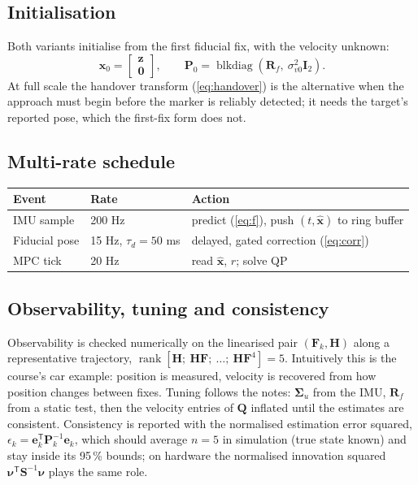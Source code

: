 \documentclass[11pt,a4paper]{article}
\newcommand{\vect}[1]{\bm{#1}}
\newcommand{\mat}[1]{\bm{#1}}
\newcommand{\T}{^{\mathsf{T}}}
\DeclareMathOperator{\blkdiag}{blkdiag}
\newcommand{\hx}{\hat{\vect{x}}}
\begin{document}
\subsection{Initialisation}
Both variants initialise from the first fiducial fix, with the velocity unknown:
\begin{equation}
\hx_0 = \begin{bmatrix}\vect z\\ \vect 0\end{bmatrix},\qquad
\mat P_0 = \blkdiag(\mat R_f,\ \sigma_{v0}^2\mat I_2).
\end{equation}
At full scale the handover transform (\ref{eq:handover}) is the alternative when the approach must begin before the marker is reliably detected; it needs the target's reported pose, which the first-fix form does not.

\subsection{Multi-rate schedule}
\begin{center}
\begin{tabular}{lll}
\toprule
Event & Rate & Action \\
\midrule
IMU sample & 200 Hz & predict (\ref{eq:f}), push $(t,\hx)$ to ring buffer \\
Fiducial pose & 15 Hz, $\tau_d=50$ ms & delayed, gated correction (\ref{eq:corr}) \\
MPC tick & 20 Hz & read $\hx$, $r$; solve QP \\
\bottomrule
\end{tabular}
\end{center}

\subsection{Observability, tuning and consistency}
Observability is checked numerically on the linearised pair $(\mat F_k,\mat H)$ along a representative trajectory, $\operatorname{rank}[\mat H;\ \mat H\mat F;\ \ldots;\ \mat H\mat F^4]=5$. Intuitively this is the course's car example: position is measured, velocity is recovered from how position changes between fixes. Tuning follows the notes: $\mat\Sigma_u$ from the IMU, $\mat R_f$ from a static test, then the velocity entries of $\mat Q$ inflated until the estimates are consistent. Consistency is reported with the normalised estimation error squared, $\epsilon_k = \vect e_k\T\mat P_k^{-1}\vect e_k$, which should average $n=5$ in simulation (true state known) and stay inside its 95\,\% bounds; on hardware the normalised innovation squared $\vect\nu\T\mat S^{-1}\vect\nu$ plays the same role.
\end{document}
